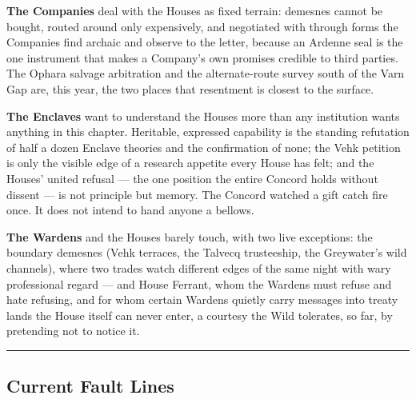 \textbf{The Companies} deal with the Houses as fixed terrain: demesnes cannot be bought, routed around only expensively, and negotiated with through forms the Companies find archaic and observe to the letter, because an Ardenne seal is the one instrument that makes a Company's own promises credible to third parties. The Ophara salvage arbitration and the alternate-route survey south of the Varn Gap are, this year, the two places that resentment is closest to the surface.

\textbf{The Enclaves} want to understand the Houses more than any institution wants anything in this chapter. Heritable, expressed capability is the standing refutation of half a dozen Enclave theories and the confirmation of none; the Vehk petition is only the visible edge of a research appetite every House has felt; and the Houses' united refusal --- the one position the entire Concord holds without dissent --- is not principle but memory. The Concord watched a gift catch fire once. It does not intend to hand anyone a bellows.

\textbf{The Wardens} and the Houses barely touch, with two live exceptions: the boundary demesnes (Vehk terraces, the Talvecq trusteeship, the Greywater's wild channels), where two trades watch different edges of the same night with wary professional regard --- and House Ferrant, whom the Wardens must refuse and hate refusing, and for whom certain Wardens quietly carry messages into treaty lands the House itself can never enter, a courtesy the Wild tolerates, so far, by pretending not to notice it.

\medskip\hrule\medskip

\subsection{Current Fault Lines}

